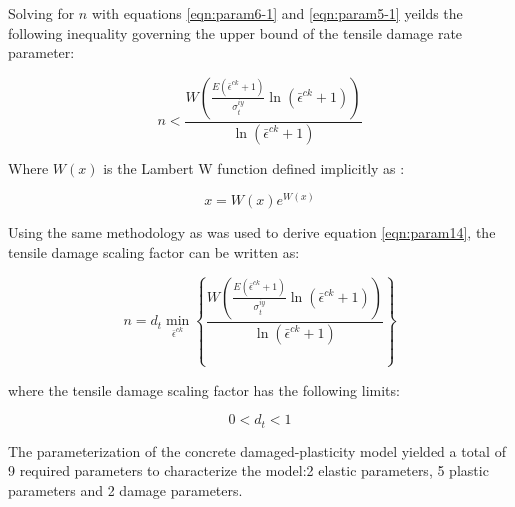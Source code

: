 Solving for $n$ with equations \ref{eqn:param6-1} and \ref{eqn:param5-1} yeilds the following inequality governing the upper bound of the tensile damage rate parameter:

\begin{equation}
n<\frac{W\left(\frac{E\left(\bar{\epsilon}^{ck}+1\right)}{\sigma_{t}^{iy}}\ln\left(\bar{\epsilon}^{ck}+1\right)\right)}{\ln\left(\bar{\epsilon}^{ck}+1\right)}\label{eqn:param7}
\end{equation}

Where $W\left(x\right)$ is the Lambert W function defined implicitly as \cite{Corless_1996}:

\begin{equation}
x=W\left(x\right)e^{W(x)}\label{eqn:param8}
\end{equation}

Using the same methodology as was used to derive equation \ref{eqn:param14}, the tensile damage scaling factor can be written as:


\begin{equation}
n=d_{t}\min_{\bar{\epsilon}^{ck}}\left\{\frac{W\left(\frac{E\left(\bar{\epsilon}^{ck}+1\right)}{\sigma_{t}^{iy}}\ln\left(\bar{\epsilon}^{ck}+1\right)\right)}{\ln\left(\bar{\epsilon}^{ck}+1\right)}\right\}
\label{eqn:param9}
\end{equation}


where the tensile damage scaling factor has the following limits:

\begin{equation}
0<d_{t}<1\label{eqn:param10}
\end{equation}

The parameterization of the concrete damaged-plasticity model yielded a total of 9 required parameters to characterize the model:2 elastic parameters, 5 plastic parameters and 2 damage parameters. 

